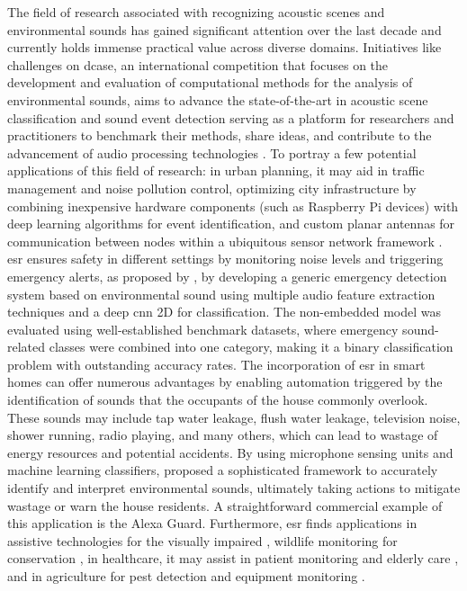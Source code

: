 The field of research associated with recognizing acoustic scenes and environmental sounds has gained significant attention over the last decade and currently holds immense practical value across diverse domains. Initiatives like challenges on \gls{dcase}, an international competition that focuses on the development and evaluation of computational methods for the analysis of environmental sounds, aims to advance the state-of-the-art in acoustic scene classification and sound event detection serving as a platform for researchers and practitioners to benchmark their methods, share ideas, and contribute to the advancement of audio processing technologies \cite{Mesaros2019}. To portray a few potential applications of this field of research: in urban planning, it may aid in traffic management and noise pollution control, optimizing city infrastructure by combining inexpensive hardware components (such as Raspberry Pi devices) with deep learning algorithms for event identification, and custom planar antennas for communication between nodes within a ubiquitous sensor network framework \cite{VidaaVila2020}. \gls{esr} ensures safety in different settings by monitoring noise levels and triggering emergency alerts, as proposed by \textcite{Sharma2021}, by developing a generic emergency detection system based on environmental sound using multiple audio feature extraction techniques and a deep \gls{cnn} 2D for classification. The non-embedded model was evaluated using well-established benchmark datasets, where emergency sound-related classes were combined into one category, making it a binary classification problem with outstanding accuracy rates. The incorporation of \gls{esr} in smart homes can offer numerous advantages by enabling automation triggered by the identification of sounds that the occupants of the house commonly overlook. These sounds may include tap water leakage, flush water leakage, television noise, shower running, radio playing, and many others, which can lead to wastage of energy resources and potential accidents. By using microphone sensing units and machine learning classifiers, \textcite{Pandya2021} proposed a sophisticated framework to accurately identify and interpret environmental sounds, ultimately taking actions to mitigate wastage or warn the house residents. A straightforward commercial example of this application is the Alexa Guard. Furthermore, \gls{esr} finds applications in assistive technologies for the visually impaired \cite{Huang2023}, wildlife monitoring for conservation \cite{Jeantet2023}, in healthcare, it may assist in patient monitoring \cite{Fukuyama2022} and elderly care \cite{Saraubon2018}, and in agriculture for pest detection \cite{Branding2023} and equipment monitoring \cite{Jeong2022}.  

